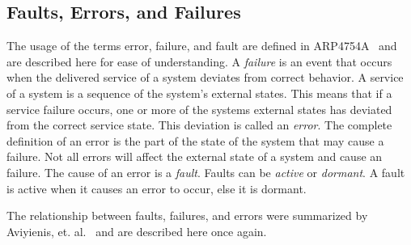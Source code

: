 \subsection{Faults, Errors, and Failures}
\label{sec:terminology}
The usage of the terms error, failure, and fault are defined in ARP4754A~\cite{SAE:ARP4754A} and are described here for ease of understanding. A \textit{failure} is an event that occurs when the delivered service of a system deviates from correct behavior. A service of a system is a sequence of the system's external states. This means that if a service failure occurs, one or more of the systems external states has deviated from the correct service state. This deviation is called an \textit{error}. The complete definition of an error is the part of the state of the system that may cause a failure. Not all errors will affect the external state of a system and cause an failure. The cause of an error is a \textit{fault}. Faults can be \textit{active} or \textit{dormant}. A fault is active when it causes an error to occur, else it is dormant.

The relationship between faults, failures, and errors were summarized by Aviyienis, et. al.~\cite{basicConcepts} and are described here once again.%

